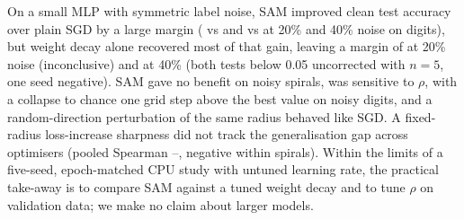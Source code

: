 On a small MLP with symmetric label noise, SAM improved clean test accuracy over plain SGD by a large margin ( vs  and  vs  at 20\% and 40\% noise on digits), but weight decay alone recovered most of that gain, leaving a margin of  at 20\% noise (inconclusive) and  at 40\% (both tests below 0.05 uncorrected with $n=5$, one seed negative). SAM gave no benefit on noisy spirals, was sensitive to $\rho$, with a collapse to chance one grid step above the best value on noisy digits, and a random-direction perturbation of the same radius behaved like SGD. A fixed-radius loss-increase sharpness did not track the generalisation gap across optimisers (pooled Spearman --, negative within spirals). Within the limits of a five-seed, epoch-matched CPU study with untuned learning rate, the practical take-away is to compare SAM against a tuned weight decay and to tune $\rho$ on validation data; we make no claim about larger models.
